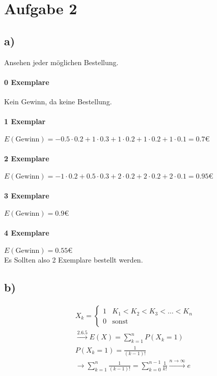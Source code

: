 \pagebreak
\section*{Aufgabe 2}
\subsection*{a)}
Ansehen jeder möglichen Bestellung.\\
\paragraph*{0 Exemplare}
Kein Gewinn, da keine Bestellung.\\
\paragraph*{1 Exemplar}
$E(\text{Gewinn})=-0.5\cdot0.2+1\cdot0.3+1\cdot0.2+1\cdot0.2+1\cdot0.1=0.7€$\\
\paragraph*{2 Exemplare}
$E(\text{Gewinn})=-1\cdot0.2+0.5\cdot0.3+2\cdot0.2+2\cdot0.2+2\cdot0.1=0.95€$\\
\paragraph*{3 Exemplare}
$E(\text{Gewinn})=0.9€$\\
\paragraph*{4 Exemplare}
$E(\text{Gewinn})=0.55€$\\
Es Sollten also 2 Exemplare bestellt werden.\\
\subsection*{b)}
\begin{align*}
&X_k=\begin{cases}
1&K_1<K_2<K_3<\ldots<K_n\\
0&\text{sonst}
\end{cases}\\
&\overset{2.6.5}{\rightarrow}E(X)=\sum_{k=1}^{n}P(X_k=1)\\
&P(X_k=1)=\frac{1}{(k-1)!}\\
&\rightarrow\sum_{k=1}^{n}\frac{1}{(k-1)!}=\sum_{k=0}^{n-1}\frac{ 1 }{ k! } \overset{n \rightarrow \infty}{\rightarrow }e\\ 
\end{align*}


